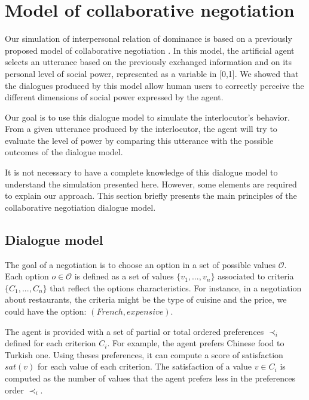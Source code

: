 \documentclass[sigconf]{aamas}  %
\begin{document}
\section{Model of collaborative negotiation}
	
	Our simulation of interpersonal relation of dominance is based on a previously proposed model of collaborative negotiation \cite{x}. In this model, the artificial agent selects an utterance based on the previously exchanged information and on its personal level of social power, represented as a variable in [0,1]. We showed that the dialogues produced by this model allow human users to correctly perceive the different dimensions of social power expressed by the agent.
	
	Our goal is to use this dialogue model to simulate the interlocutor's behavior. From a given utterance produced by the interlocutor, the agent will try to evaluate the level of power by comparing this utterance with the possible outcomes of the dialogue model.
	
	It is not necessary to have a complete knowledge of this dialogue model to understand the simulation presented here. However, some elements are required to explain our approach. This section briefly presents the main principles of the collaborative negotiation dialogue model.
	
	\subsection{Dialogue model}
	
	The goal of a negotiation is to choose an option in a set of possible values $\mathcal{O}$. Each option $o\in\mathcal{O}$ is defined as a set of values $\{v_1, ..., v_n\}$ associated to criteria $\{C_1, ..., C_n\}$ that reflect the options characteristics.  For instance, in a negotiation about restaurants, the criteria might be the type of cuisine and the price, we could have the option: $(French,expensive)$.
	
	The agent is provided with a set of partial or total ordered preferences $\prec_i$ defined for each criterion $C_i$. For example, the agent prefers Chinese food to Turkish one. Using theses preferences, it can compute a score of satisfaction $sat(v)$ for each value of each criterion. The satisfaction of a value $v \in C_i$ is computed as the number of values that the agent prefers less in the preferences order $\prec_i$.
	
\end{document}
